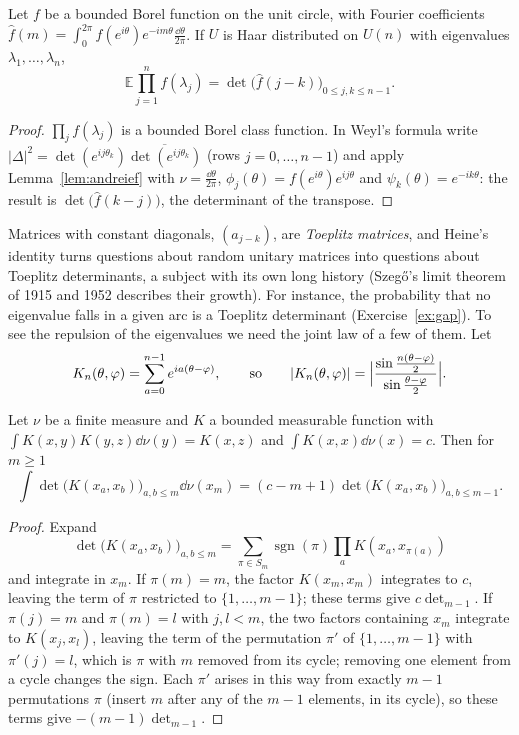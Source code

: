 \begin{theorem}\label{thm:heine}
Let $f$ be a bounded Borel function on the unit circle, with Fourier coefficients $\hat f(m)=\int_0^{2\pi}f(e^{i\theta})e^{-im\theta}\frac{\dd\theta}{2\pi}$. If $U$ is Haar distributed on $U(n)$ with
eigenvalues $\lambda_1,\dots,\lambda_n$,
\[\mathbb E\prod_{j=1}^nf(\lambda_j)=\det\bigl(\hat f(j-k)\bigr)_{0\le j,k\le n-1}.\]
\end{theorem}

\begin{proof}
$\prod_jf(\lambda_j)$ is a bounded Borel class function. In Weyl's formula write $|\Delta|^2=\det(e^{ij\theta_k})\overline{\det(e^{ij\theta_k})}$ (rows $j=0,\dots,n-1$) and apply Lemma~\ref{lem:andreief} with
$\nu=\frac{\dd\theta}{2\pi}$, $\phi_j(\theta)=f(e^{i\theta})e^{ij\theta}$ and $\psi_k(\theta)=e^{-ik\theta}$: the result is $\det\bigl(\hat f(k-j)\bigr)$, the determinant of the transpose.
\end{proof}

Matrices with constant diagonals, $(a_{j-k})$, are \emph{Toeplitz matrices}, and Heine's identity turns questions about random unitary matrices into questions about Toeplitz determinants,
a subject with its own long history (Szeg\H o's limit theorem of 1915 and 1952 describes their growth). For instance, the probability that no eigenvalue falls in a given arc is a Toeplitz
determinant (Exercise~\ref{ex:gap}). To see the repulsion of the eigenvalues we need the joint law of a few of them. Let
\[K_n(\theta,\varphi)=\sum_{a=0}^{n-1}e^{ia(\theta-\varphi)},\qquad\text{so}\qquad|K_n(\theta,\varphi)|=\Bigl|\frac{\sin\frac{n(\theta-\varphi)}2}{\sin\frac{\theta-\varphi}2}\Bigr|.\]

\begin{lemma}[Gaudin]\label{lem:gaudin}
Let $\nu$ be a finite measure and $K$ a bounded measurable function with $\int K(x,y)K(y,z)\dd\nu(y)=K(x,z)$ and $\int K(x,x)\dd\nu(x)=c$. Then for $m\ge1$
\[\int\det\bigl(K(x_a,x_b)\bigr)_{a,b\le m}\dd\nu(x_m)=(c-m+1)\det\bigl(K(x_a,x_b)\bigr)_{a,b\le m-1}.\]
\end{lemma}

\begin{proof}
Expand
\[\det\bigl(K(x_a,x_b)\bigr)_{a,b\le m}=\sum_{\pi\in S_m}\operatorname{sgn}(\pi)\prod_aK(x_a,x_{\pi(a)})\]
and integrate in $x_m$. If $\pi(m)=m$, the factor $K(x_m,x_m)$ integrates to $c$, leaving the term of $\pi$
restricted to $\{1,\dots,m-1\}$; these terms give $c\det_{m-1}$. If $\pi(j)=m$ and $\pi(m)=l$ with $j,l<m$, the two factors containing $x_m$ integrate to $K(x_j,x_l)$, leaving the term of the
permutation $\pi'$ of $\{1,\dots,m-1\}$ with $\pi'(j)=l$, which is $\pi$ with $m$ removed from its cycle; removing one element from a cycle changes the sign. Each $\pi'$ arises in this way
from exactly $m-1$ permutations $\pi$ (insert $m$ after any of the $m-1$ elements, in its cycle), so these terms give $-(m-1)\det_{m-1}$.
\end{proof}

